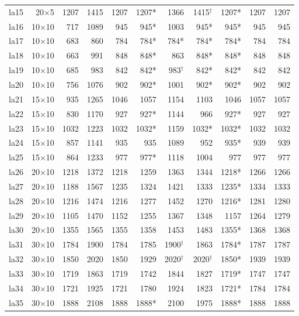 {\begin{longtable}{lrrrrrrrrrr}
la15 & 20$\times$5 & 1207 & 1415 & 1207 & 1207* & 1366 & 1415$^\dagger$ & 1207* & 1207 & 1207 \\
la16 & 10$\times$10 & 717 & 1089 & 945 & 945* & 1003 & 945* & 945* & 945 & 945 \\
la17 & 10$\times$10 & 683 & 860 & 784 & 784* & 784* & 784* & 784* & 784 & 784 \\
la18 & 10$\times$10 & 663 & 991 & 848 & 848* & 863 & 848* & 848* & 848 & 848 \\
la19 & 10$\times$10 & 685 & 983 & 842 & 842* & 983$^\dagger$ & 842* & 842* & 842 & 842 \\
la20 & 10$\times$10 & 756 & 1076 & 902 & 902* & 1001 & 902* & 902* & 902 & 902 \\
la21 & 15$\times$10 & 935 & 1265 & 1046 & 1057 & 1154 & 1103 & 1046 & 1057 & 1057 \\
la22 & 15$\times$10 & 830 & 1170 & 927 & 927* & 1144 & 966 & 927* & 927 & 927 \\
la23 & 15$\times$10 & 1032 & 1223 & 1032 & 1032* & 1159 & 1032* & 1032* & 1032 & 1032 \\
la24 & 15$\times$10 & 857 & 1141 & 935 & 935 & 1089 & 952 & 935* & 939 & 939 \\
la25 & 15$\times$10 & 864 & 1233 & 977 & 977* & 1118 & 1004 & 977 & 977 & 977 \\
la26 & 20$\times$10 & 1218 & 1372 & 1218 & 1259 & 1363 & 1344 & 1218* & 1266 & 1266 \\
la27 & 20$\times$10 & 1188 & 1567 & 1235 & 1324 & 1421 & 1333 & 1235* & 1334 & 1333 \\
la28 & 20$\times$10 & 1216 & 1474 & 1216 & 1277 & 1452 & 1270 & 1216* & 1281 & 1280 \\
la29 & 20$\times$10 & 1105 & 1470 & 1152 & 1255 & 1367 & 1348 & 1157 & 1264 & 1279 \\
la30 & 20$\times$10 & 1355 & 1565 & 1355 & 1358 & 1453 & 1483 & 1355* & 1368 & 1368 \\
la31 & 30$\times$10 & 1784 & 1900 & 1784 & 1785 & 1900$^\dagger$ & 1863 & 1784* & 1787 & 1787 \\
la32 & 30$\times$10 & 1850 & 2020 & 1850 & 1929 & 2020$^\dagger$ & 2020$^\dagger$ & 1850* & 1939 & 1939 \\
la33 & 30$\times$10 & 1719 & 1863 & 1719 & 1742 & 1844 & 1827 & 1719* & 1747 & 1747 \\
la34 & 30$\times$10 & 1721 & 1925 & 1721 & 1780 & 1924 & 1823 & 1721* & 1784 & 1784 \\
la35 & 30$\times$10 & 1888 & 2108 & 1888 & 1888* & 2100 & 1975 & 1888* & 1888 & 1888 \\

\end{longtable}}
